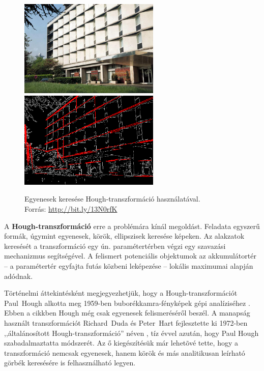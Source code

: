 \begin{figure}[!ht]
\centering
\includegraphics[width=67mm, keepaspectratio]{figures/houghline_building_1.png}\hspace{1cm}
\includegraphics[width=67mm, keepaspectratio]{figures/houghline_building_2.png}
\caption{Egyenesek keresése Hough-transzformáció használatával.\\Forrás: \url{http://bit.ly/13N0rfK}}
\label{fig:houghlines}
\end{figure}

A \textbf{Hough-transzformáció} erre a problémára kínál megoldást. Feladata egyszerű formák, úgymint egyenesek, körök, ellipszisek keresése képeken. Az alakzatok keresését a transzformáció egy ún. paramétertérben végzi egy szavazási mechanizmus segítségével. A felismert potenciális objektumok az akkumulátortér -- a paramétertér egyfajta futás közbeni leképezése -- lokális maximumai alapján adódnak.

\bigskip

Történelmi áttekintésként megjegyezhetjük, hogy a Hough-transzformációt Paul~Hough alkotta meg 1959-ben buborékkamra-fényképek gépi analíziséhez \cite{hough_eredeti}. Ebben a cikkben Hough még csak egyenesek felismeréséről beszél. A manapság használt transzformációt Richard~Duda és Peter~Hart fejlesztette ki 1972-ben ,,általánosított Hough-transzformáció'' néven \cite{hough_duda}, tíz évvel azután, hogy Paul Hough szabadalmaztatta módszerét. Az ő kiegészítésük már lehetõvé tette, hogy a transzformáció nemcsak egyenesek, hanem körök és más analitikusan leírható görbék keresésére is felhasználható legyen.

